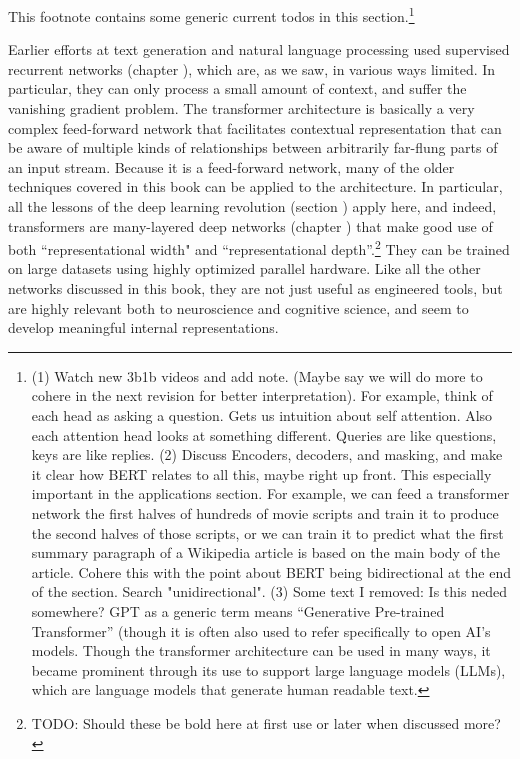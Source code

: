 This footnote contains some generic current todos in this section.\footnote{(1) Watch new 3b1b videos and add note.  (Maybe say we will do more to cohere in the next revision for better interpretation). For example, think of each head as asking a question. Gets us intuition about self attention. Also each attention head looks at something different. Queries are like questions, keys are like replies. (2) Discuss Encoders, decoders, and masking, and make it clear how BERT relates to all this, maybe right up front. This especially important in the applications section. For example, we can feed a transformer network the first halves of hundreds of movie scripts and train it to produce the second halves of those scripts, or we can train it to predict what the first summary paragraph of a Wikipedia article is based on the main body of the article. Cohere this with the point about BERT being bidirectional at the end of the section. Search "unidirectional". (3) Some text I removed: Is this neded somewhere? GPT as a generic term means “Generative Pre-trained Transformer” (though it is often also used to refer specifically to open AI’s models. Though the transformer architecture can be used in many ways, it became prominent through its use to support large language models (LLMs), which are language models that generate human readable text.}

Earlier efforts at text generation and natural language processing used supervised recurrent networks (chapter ), which are, as we saw, in various ways limited. In particular, they can only process a small amount of context, and suffer the vanishing gradient problem. The transformer architecture is basically a very complex feed-forward network that facilitates contextual representation that can be aware of multiple kinds of relationships between arbitrarily far-flung parts of an input stream. Because it is a feed-forward network, many of the older techniques covered in this book can be applied to the architecture. In particular, all the lessons of the deep learning revolution (section ) apply here, and indeed, transformers are many-layered deep networks (chapter ) that make good use of both ``representational width" and ``representational depth''.\footnote{TODO: Should these be bold here at first use or later when discussed more?}  They can be trained on large datasets using highly optimized parallel hardware. Like all the other networks discussed in this book, they are not just useful as engineered tools, but are highly relevant both to neuroscience and cognitive science, and seem to develop meaningful internal representations. 

